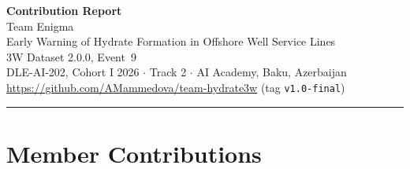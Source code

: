 \documentclass[11pt,a4paper]{article}
\begin{document}
\begin{center}
  {\LARGE\bfseries Contribution Report}\\[0.6em]
  {\large Team Enigma}\\[0.3em]
  {\normalsize Early Warning of Hydrate Formation in Offshore Well Service Lines}\\[0.2em]
  {\normalsize 3W Dataset 2.0.0, Event~9}\\[0.2em]
  {\normalsize DLE-AI-202, Cohort I 2026 $\cdot$ Track 2 $\cdot$ AI Academy, Baku, Azerbaijan}\\[0.2em]
  {\small \url{https://github.com/AMammedova/team-hydrate3w} (tag \texttt{v1.0-final})}
\end{center}

\vspace{0.8em}
\hrule
\vspace{1em}

\section*{Member Contributions}
\end{document}

